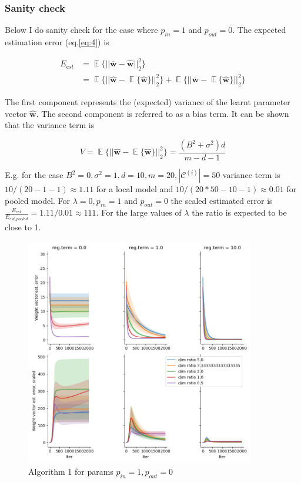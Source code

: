 \documentclass{article}
\begin{document}
\newpage
\subsubsection{Sanity check}
Below I do sanity check for the case where $p_{in}=1$ and $p_{out}=0$. The expected estimation error (eq.\ref{eq:4}) is  

\begin{equation}
\begin{split}
E_{est} & = \mathop{\mathbb{E}}\{||\mathbf{\overline{w}} - \mathbf{\widehat{w}}||^2_2\} \\
& = \mathop{\mathbb{E}}\{||\mathbf{\widehat{w}}- \mathop{\mathbb{E}}\{\mathbf{\widehat{w}}\}||^2_2\} + 
\mathop{\mathbb{E}}\{||\mathbf{\overline{w}} - \mathop{\mathbb{E}}\{\mathbf{\widehat{w}}\}||^2_2\}
\end{split}
\end{equation}

The first component represents the (expected) variance of the learnt parameter vector $\mathbf{\widehat{w}}$. The second component is referred to as a bias term. It can be shown that the variance term is

\begin{equation} 
V = \mathop{\mathbb{E}}\{||\mathbf{\widehat{w}}- \mathop{\mathbb{E}}\{\mathbf{\widehat{w}}\}||^2_2\} = \frac{(B^2 + \sigma^2)d}{m-d-1}
\end{equation}

E.g. for the case $B^2=0, \sigma^2=1, d=10, m=20, |\mathcal{C}^{(i)}|=50$ variance term is $10/(20-1-1)  \approx 1.11$ for a local model and  $10/(20*50-10-1)  \approx 0.01$ for pooled model.
For $\lambda = 0, p_{in}=1$ and $p_{out}=0$ the scaled estimated error is $\frac{E_{est}}{E_{est\_pooled}} = 1.11/0.01 \approx 111$. For the large values of $\lambda$ the ratio is expected to be close to 1.

\begin{figure}[h]
\includegraphics[width=10cm]{Linreg_Torch_594391_est_error.png}
\caption{Algorithm 1 for params $p_{in}=1, p_{out}=0$}
\end{figure}
\end{document}
